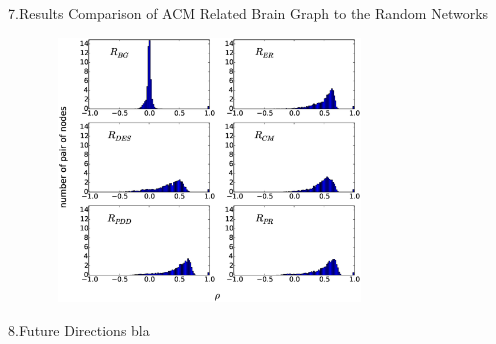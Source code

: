 \documentclass{beamer}
\begin{document}
\begin{frame}{7.Results}
\footnotesize{Comparison of ACM Related Brain Graph to the Random Networks}

\includegraphics[width=0.8\textwidth, height = 7cm]{Figures/Random_ACM_histo.eps}

\end{frame}


\begin{frame}{8.Future Directions}
bla
\end{frame}
\end{document}
